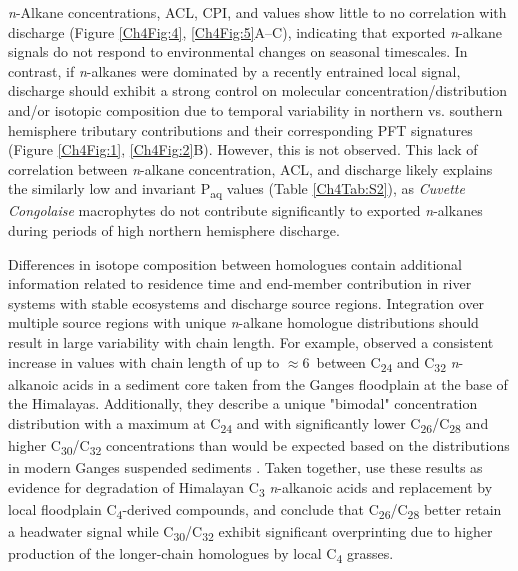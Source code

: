 \textit{n}-Alkane concentrations, ACL, CPI, and  values show little to no correlation with discharge (Figure \ref{Ch4Fig:4}, \ref{Ch4Fig:5}A--C), indicating that exported \textit{n}-alkane signals do not respond to environmental changes on seasonal timescales. In contrast, if \textit{n}-alkanes were dominated by a recently entrained local signal, discharge should exhibit a strong control on molecular concentration/distribution and/or isotopic composition due to temporal variability in northern vs. southern hemisphere tributary contributions and their corresponding PFT signatures (Figure \ref{Ch4Fig:1}, \ref{Ch4Fig:2}B). However, this is not observed. This lack of correlation between \textit{n}-alkane concentration, ACL, and discharge likely explains the similarly low and invariant P\textsubscript{aq} values (Table \ref{Ch4Tab:S2}), as \textit{Cuvette Congolaise} macrophytes do not contribute significantly to exported \textit{n}-alkanes during periods of high northern hemisphere discharge.

Differences in isotope composition between homologues contain additional information related to residence time and end-member contribution in river systems with stable ecosystems and discharge source regions. Integration over multiple source regions with unique \textit{n}-alkane homologue distributions should result in large  variability with chain length. For example, \citet{Agrawal:2014fl} observed a consistent increase in  values with chain length of up to $\approx 6$\textperthousand\ between C\textsubscript{24} and C\textsubscript{32} \textit{n}-alkanoic acids in a sediment core taken from the Ganges floodplain at the base of the Himalayas. Additionally, they describe a unique "bimodal" concentration distribution with a maximum at C\textsubscript{24} and with significantly lower C\textsubscript{26}/C\textsubscript{28} and higher C\textsubscript{30}/C\textsubscript{32} concentrations than would be expected based on the distributions in modern Ganges suspended sediments \citep{Galy:2011ix}. Taken together, \citet{Agrawal:2014fl} use these results as evidence for degradation of Himalayan C\textsubscript{3} \textit{n}-alkanoic acids and replacement by local floodplain C\textsubscript{4}-derived compounds, and conclude that C\textsubscript{26}/C\textsubscript{28} better retain a headwater signal while C\textsubscript{30}/C\textsubscript{32} exhibit significant overprinting due to higher production of the longer-chain homologues by local C\textsubscript{4} grasses.

